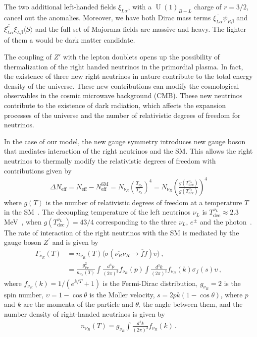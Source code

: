 \documentclass[12pt]{article}
\begin{document}
The two additional left-handed fields $\xi_{L\alpha}$,  with a $\operatorname{U}(1)_{B-L}$ charge of $r=3/2$,  cancel out the anomalies. Moreover, we have both Dirac mass terms $\overline{\xi_{L \alpha}}\psi_{R \beta}$ and $ \overline{\xi_{L\alpha}^c }\xi_{L \beta} \langle S\rangle$ and the full set of Majorana fields are massive and heavy. The lighter of them a would be dark matter candidate.


The coupling of $Z'$ with the lepton doublets opens up the possibility
of thermalization of the right handed neutrinos in the primordial
plasma.
In fact, the existence of three new right neutrinos in nature
contribute to the total energy density of the universe. These new
contributions can modify the cosmological observables in the cosmic
microwave background (CMB). These new neutrinos contribute to the
existence of dark radiation, which affects the expansion processes of
the universe and the number of relativistic degrees of freedom for
neutrinos.

In the case of our model, the new gauge symmetry introduces  new gauge boson that mediates interaction of the right neutrinos and the SM. This allows the right neutrinos to thermally modify the relativistic degrees of freedom with contributions given by~\cite{Anchordoqui:2012qu,Anchordoqui:2011nh}
%
\begin{align*}
    \Delta N_{\text{eff}} = N_{\text{eff}} - N^{\text{SM}}_{\text{eff}} = N_{\nu_R} \left( \frac{T_{\nu_{R}}}{T_{\nu_{L}}} \right)^{4} = N_{\nu_R} \left( \frac{g(T^{\nu_{L}}_{\text{dec}})}{g(T^{\nu_{R}}_{\text{dec}})} \right)^{4}
\end{align*}
%
where $ g(T) $ is the number of relativistic degrees of freedom at a temperature $T$ in the SM~\cite{Aghanim:2018eyx}. The decoupling temperature of the left neutrinos $\nu_L$ is $ T^{\nu_{L}}_{\text{dec}} \approx 2.3 $ MeV~\cite{Enqvist:1991gx}, when $g(T^{\nu_{L}}_{ \text{dec}}) = 43/4 $ corresponding to the three $\nu_{L}$, $e^{\pm} $ and the photon~\cite{Kolb:1990vq}. The rate of interaction of the right neutrinos with the SM is mediated by the gauge boson $Z^{\prime} $ and is given by~\cite{SolagurenBeascoa:2012cz}
%
\begin{align*}
    \Gamma_{\nu_R} (T) &= n_{\nu_R}(T) \langle \sigma(\overline{\nu_{R}} \nu_{R} \to \overline{f} f) \upsilon \rangle \,, \\
    &= \frac{g^{2}_{\nu_R}}{n_{\nu_R}(T)} \int \frac{d^{3} p}{(2 \pi)^{3}} f_{\nu_R}(p) \int \frac{d^{3} k}{(2 \pi)^{3}} f_{\nu_R}(k) \sigma_{f}(s) \upsilon\,,
\end{align*}
%
where $f_{\nu_R}(k)=1/(e^{k/T}+1)$ is the Fermi-Dirac distribution, $g_{\nu_R} = 2$ is the spin number, $\upsilon = 1-\cos{\theta}$ is the Moller velocity, $s = 2 p k (1-\cos{\theta})$, where $p$ and $k$ are the momenta of the particle and $\theta$, the angle between them, and the number density of right-handed neutrinos is given by
\begin{align*}
n_{\nu_R}(T) = g_{\nu_R} \int \frac{d^{3} k}{(2 \pi)^{3}} f_{\nu_R}(k)\,.
\end{align*}
\end{document}
